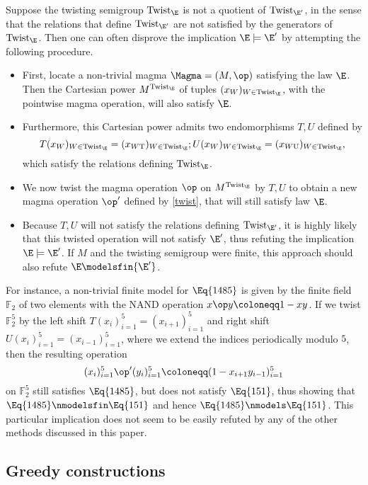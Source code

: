 Suppose the twisting semigroup $\operatorname{Twist}_\E$ is not a quotient of $\operatorname{Twist}_{{\E'}}$, in the sense that the relations that define $\operatorname{Twist}_{{\E'}}$ are not satisfied by the generators of $\operatorname{Twist}_\E$.  Then one can often disprove the implication $\E \models {\E'}$ by attempting the following procedure.
\begin{itemize}
\item First, locate a non-trivial magma $\Magma = (M,\op)$ satisfying the law $\E$.  Then the Cartesian power $M^{\operatorname{Twist}_\E}$ of tuples $(x_W)_{W \in \operatorname{Twist}_\E}$, with the pointwise magma operation, will also satisfy $\E$.
\item Furthermore, this Cartesian power admits two endomorphisms $T, U$ defined by
$$ T (x_W)_{W \in \operatorname{Twist}_\E} = (x_{W \mathrm{T}})_{W \in \operatorname{Twist}_\E};
U (x_W)_{W \in \operatorname{Twist}_\E} = (x_{W \mathrm{U}})_{W \in \operatorname{Twist}_\E},$$
which satisfy the relations defining $\operatorname{Twist}_\E$.
\item We now twist the magma operation $\op$ on $M^{\operatorname{Twist}_\E}$ by $T,U$ to obtain a new magma operation $\op'$ defined by \eqref{twist}, that will still satisfy law $\E$.
\item Because $T, U$ will not satisfy the relations defining $\operatorname{Twist}_{{\E'}}$, it is highly likely that this twisted operation will not satisfy ${\E'}$, thus refuting the implication $\E \models {\E'}$.  If $M$ and the twisting semigroup were finite, this approach should also refute $\E \modelsfin {\E'}$.
\end{itemize}

For instance, a non-trivial finite model for $\Eq{1485}$ is given by the finite field $\mathbb{F}_2$ of two elements with the NAND operation $x \op y \coloneqq 1-xy$.  If we twist $\mathbb{F}_2^5$ by the left shift $T(x_i)_{i=1}^5 = (x_{i+1})_{i=1}^5$ and right shift $U(x_i)_{i=1}^5 = (x_{i-1})_{i=1}^5$, where we extend the indices periodically modulo $5$, then the resulting operation
$$ (x_i)_{i=1}^5 \op' (y_i)_{i=1}^5 \coloneqq (1 - x_{i+1} y_{i-1})_{i=1}^5$$
on $\mathbb{F}_2^5$ still satisfies $\Eq{1485}$, but does not satisfy $\Eq{151}$, thus showing that $\Eq{1485} \nmodelsfin \Eq{151}$ and hence $\Eq{1485} \nmodels \Eq{151}$.  This particular implication does not seem to be easily refuted by any of the other methods discussed in this paper.

\subsection{Greedy constructions}\label{greedy-sec}

